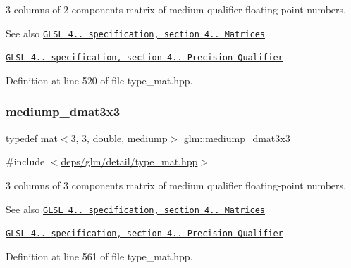 3 columns of 2 components matrix of medium qualifier floating-\/point numbers.

\begin{DoxySeeAlso}{See also}
\href{http://www.opengl.org/registry/doc/GLSLangSpec.4.20.8.pdf}{\tt G\+L\+SL 4.. specification, section 4.. Matrices} 

\href{http://www.opengl.org/registry/doc/GLSLangSpec.4.20.8.pdf}{\tt G\+L\+SL 4.. specification, section 4.. Precision Qualifier} 
\end{DoxySeeAlso}


Definition at line 520 of file type\+\_\+mat.\+hpp.

\mbox{\label{group__core__precision_ga8ecaed5443b0aa73bbe8683fcbb04f65}} 
\subsubsection{\texorpdfstring{mediump\+\_\+dmat3x3}{mediump\_dmat3x3}}
{\footnotesize\ttfamily typedef \hyperlink{structglm_1_1mat}{mat}$<$3, 3, double, mediump$>$ \hyperlink{group__core__precision_ga8ecaed5443b0aa73bbe8683fcbb04f65}{glm\+::mediump\+\_\+dmat3x3}}



{\ttfamily \#include $<$\hyperlink{type__mat_8hpp}{deps/glm/detail/type\+\_\+mat.\+hpp}$>$}

3 columns of 3 components matrix of medium qualifier floating-\/point numbers.

\begin{DoxySeeAlso}{See also}
\href{http://www.opengl.org/registry/doc/GLSLangSpec.4.20.8.pdf}{\tt G\+L\+SL 4.. specification, section 4.. Matrices} 

\href{http://www.opengl.org/registry/doc/GLSLangSpec.4.20.8.pdf}{\tt G\+L\+SL 4.. specification, section 4.. Precision Qualifier} 
\end{DoxySeeAlso}


Definition at line 561 of file type\+\_\+mat.\+hpp.

\mbox{\label{group__core__precision_ga8e38f500f63f5caed06699264acfb456}} 

